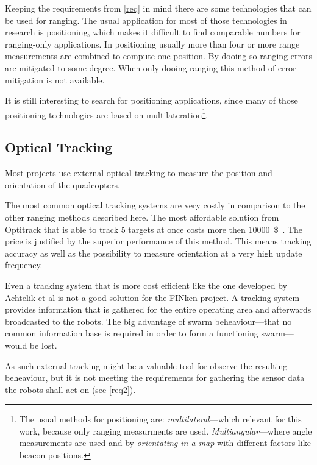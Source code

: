 Keeping the requirements from \autoref{req} in mind  there are some technologies that can be used for ranging.
The usual application for most of those technologies in research is positioning, which makes it difficult to find comparable numbers for ranging-only applications.
In positioning usually more than four or more range measurements are combined to compute one position.
By dooing so ranging errors are mitigated to some degree.
When only dooing ranging this method of error mitigation is not available.

It is still interesting to search for positioning applications, since many of those positioning technologies are based on multilateration\footnote{The usual methods for positioning are: \emph{multilateral}—which relevant for this work, because only ranging measurments are used. \emph{Multiangular}—where angle measurements are used and by \emph{orientating in a map} with different factors like beacon-positions.}.
\cite{_multilateration_2015}

\subsection{Optical Tracking}

Most projects use external optical tracking to measure the position and orientation of the quadcopters. 

The most common optical tracking systems are very costly in comparison to the other ranging methods described here.
The most affordable solution from Optitrack that is able to track 5 targets at once costs more then \SI{10000}{\$}~\cite{optitrack.com}.
The price is justified by the superior performance of this method.
This means tracking accuracy as well as the possibility to measure orientation at a very high update frequency.


Even a tracking system that is more cost efficient like the one developed by Achtelik et al\cite{Achtelik2009} is not a good solution for the FINken project.
A tracking system provides information that is gathered for the entire operating area and afterwards broadcasted to the robots.
The big advantage of swarm beheaviour—that no common information base is required in order to form a functioning swarm—would be lost.

As such external tracking might be a valuable tool for observe the resulting beheaviour, but it is not meeting the requirements for gathering the sensor data the robots shall act on (see \autoref{req2}).

